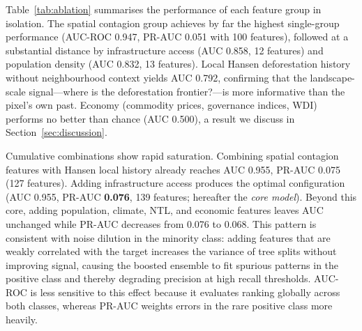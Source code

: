 \documentclass{iopart}
\begin{document}
Table~\ref{tab:ablation} summarises the performance of each feature group
in isolation.
The spatial contagion group achieves by far the highest single-group
performance (AUC-ROC 0.947, PR-AUC 0.051 with 100 features), followed
at a substantial distance by infrastructure access (AUC 0.858, 12 features)
and population density (AUC 0.832, 13 features).
Local Hansen deforestation history without neighbourhood context yields
AUC 0.792, confirming that the landscape-scale signal---where is the
deforestation frontier?---is more informative than the pixel's own past.
Economy (commodity prices, governance indices, WDI) performs no better
than chance (AUC 0.500), a result we discuss in
Section~\ref{sec:discussion}.

Cumulative combinations show rapid saturation.
Combining spatial contagion features with Hansen local history
already reaches AUC 0.955, PR-AUC 0.075 (127 features).
Adding infrastructure access produces the optimal configuration
(AUC 0.955, PR-AUC \textbf{0.076}, 139 features; hereafter
the \emph{core model}).
Beyond this core, adding population, climate, NTL, and economic features
leaves AUC unchanged while PR-AUC decreases from 0.076 to 0.068.
This pattern is consistent with noise dilution in the minority class:
adding features that are weakly correlated with the target increases
the variance of tree splits without improving signal, causing the
boosted ensemble to fit spurious patterns in the positive class and
thereby degrading precision at high recall thresholds.
AUC-ROC is less sensitive to this effect because it evaluates ranking
globally across both classes, whereas PR-AUC weights errors in the
rare positive class more heavily.
\end{document}
